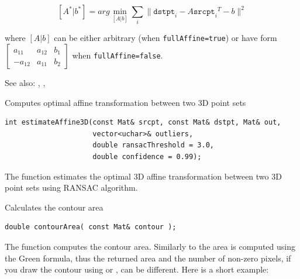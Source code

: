 \begin{description}
\[ [A^*|b^*] = arg \min_{[A|b]} \sum_i \|\texttt{dstpt}_i - A {\texttt{srcpt}_i}^T - b \|^2 \]

where $[A|b]$ can be either arbitrary (when \texttt{fullAffine=true}) or have form
$\begin{bmatrix}a_{11} & a_{12} & b_1 \\ -a_{12} & a_{11} & b_2 \end{bmatrix}$ when \texttt{fullAffine=false}.

See also: , , 

\label{estimateAffine3D}
Computes optimal affine transformation between two 3D point sets

\begin{lstlisting}
int estimateAffine3D(const Mat& srcpt, const Mat& dstpt, Mat& out,
                     vector<uchar>& outliers,
                     double ransacThreshold = 3.0,
                     double confidence = 0.99);
\end{lstlisting}
\begin{description}
\end{description}

The function estimates the optimal 3D affine transformation between two 3D point sets using RANSAC algorithm.


\label{contourArea}
Calculates the contour area

\begin{lstlisting}
double contourArea( const Mat& contour );    
\end{lstlisting}
\begin{description}
\end{description}

The function computes the contour area. Similarly to  the area is computed using the Green formula, thus the returned area and the number of non-zero pixels, if you draw the contour using  or , can be different.
Here is a short example:


\end{description}

